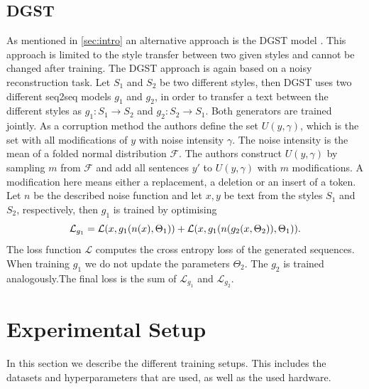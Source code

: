 \documentclass[twocolumn]{tum-article}
\begin{document}
\subsection{DGST}\label{sec:dgst}
As mentioned in \autoref{sec:intro} an alternative approach is the DGST model \cite{li2020dgst}. This approach is limited to the style transfer between two given styles and cannot be changed after training. The DGST approach is again based on a noisy reconstruction task. Let $S_1$ and $S_2$ be two different styles, then DGST uses two different seq2seq models $g_1$ and $g_2$, in order to transfer a text between the different styles as $g_1: S_1 \rightarrow S_2$ and $g_2: S_2 \rightarrow S_1$. Both generators are trained jointly. As a corruption method the authors define the set $U(y, \gamma)$, which is the set with all modifications of $y$ with noise intensity $\gamma$. The noise intensity is the mean of a folded normal distribution $\mathcal{F}$. The authors construct $U(y, \gamma)$ by sampling $m$ from $\mathcal{F}$ and add all sentences $y'$ to $U(y, \gamma)$ with $m$ modifications. A modification here means either a replacement, a deletion or an insert of a token. Let $n$ be the described noise function and let $x, y$ be text from the styles $S_1$ and $S_2$, respectively, then $g_1$ is trained by optimising 
$$
\mathcal{L}_{g_1} = \mathcal{L}(x, g_1(n(x), \Theta_1)) + \mathcal{L}(x, g_1(n(g_2(x, \Theta_2)), \Theta_1))\textnormal{.}
$$
The loss function $\mathcal{L}$ computes the cross entropy loss of the generated sequences. When training $g_1$ we do not update the parameters $\Theta_2$. The $g_2$ is trained analogously.The final loss is the sum of $\mathcal{L}_{g_1}$ and $\mathcal{L}_{g_2}$.
\section{Experimental Setup}\label{sec:experiment_setup}
In this section we describe the different training setups. This includes the datasets and hyperparameters that are used, as well as the used hardware.
\end{document}
